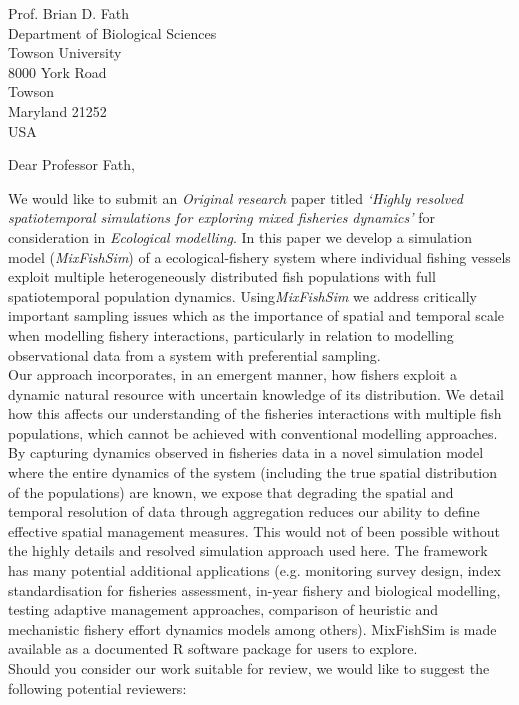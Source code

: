 \documentclass[12pt]{letter}
\begin{document}
\begin{letter}{Prof. Brian D. Fath \\ Department of Biological Sciences \\
		Towson University \\ 8000 York Road \\ Towson \\ Maryland 21252 \\ USA}
\opening{Dear Professor Fath,}

We would like to submit an \emph{Original research} paper titled \emph{`Highly
	resolved spatiotemporal simulations for exploring mixed fisheries
	dynamics'} for consideration in \emph{Ecological modelling}. In this
paper we develop a simulation model (\emph{MixFishSim}) of a ecological-fishery
system where individual fishing vessels exploit multiple heterogeneously
distributed fish populations with full spatiotemporal population dynamics.
Using\emph{MixFishSim} we address critically important sampling issues which as
the importance of spatial and temporal scale when modelling fishery
interactions, particularly in relation to modelling observational data from a
system with preferential sampling.\\

Our approach incorporates, in an emergent manner, how fishers exploit a dynamic
natural resource with uncertain knowledge of its distribution. We detail how
this affects our understanding of the fisheries interactions with multiple fish
populations, which cannot be achieved with conventional modelling approaches.
By capturing dynamics observed in fisheries data in a novel simulation model
where the entire dynamics of the system (including the true spatial
distribution of the populations) are known, we expose that degrading the
spatial and temporal resolution of data through aggregation reduces our ability
to define effective spatial management measures. This would not of been
possible without the highly details and resolved simulation approach used here.
The framework has many potential additional applications (e.g. monitoring
survey design, index standardisation for fisheries assessment, in-year fishery
and biological modelling, testing adaptive management approaches, comparison of
heuristic and mechanistic fishery effort dynamics models among others).
MixFishSim is made available as a documented R software package for users to
explore.\\

Should you consider our work suitable for review, we would like to suggest the
following potential reviewers:


\end{letter}
\end{document}

